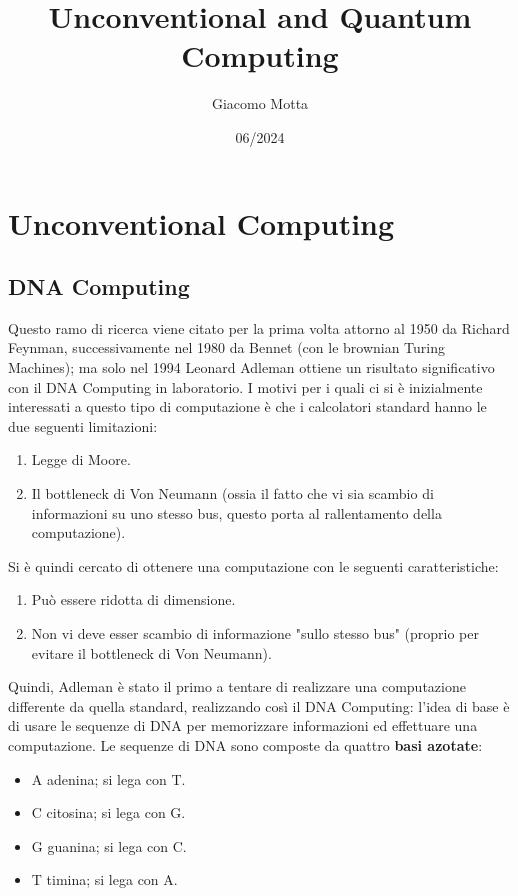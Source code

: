 \documentclass[12pt,a4paper]{report}
\begin{document}
\title{Unconventional and Quantum Computing}
\author{Giacomo Motta}
\date{06/2024}

\maketitle
\tableofcontents

\part{Unconventional Computing}

\chapter{DNA Computing}

Questo ramo di ricerca viene citato per la prima volta attorno al 1950 da Richard Feynman, successivamente nel 1980 da Bennet (con le brownian Turing Machines); ma solo nel 1994 Leonard Adleman ottiene un risultato significativo con il DNA Computing in laboratorio. I motivi per i quali ci si è inizialmente interessati a questo tipo di computazione è che i calcolatori standard hanno le due seguenti limitazioni:
\begin{enumerate}
\item Legge di Moore.
\item Il bottleneck di Von Neumann (ossia il fatto che vi sia scambio di informazioni su uno stesso bus, questo porta al rallentamento della computazione).
\end{enumerate}
Si è quindi cercato di ottenere una computazione con le seguenti caratteristiche:
\begin{enumerate}
\item Può essere ridotta di dimensione.
\item Non vi deve esser scambio di informazione "sullo stesso bus" (proprio per evitare il bottleneck di Von Neumann).
\end{enumerate}
Quindi, Adleman è stato il primo a tentare di realizzare una computazione differente da quella standard, realizzando così il DNA Computing: l'idea di base è di usare le sequenze di DNA per memorizzare informazioni ed effettuare una computazione. Le sequenze di DNA sono composte da quattro \textbf{basi azotate}:
\begin{itemize}
\item A adenina; si lega con T.
\item C citosina; si lega con G.
\item G guanina; si lega con C.
\item T timina; si lega con A.
\end{itemize}
\end{document}
